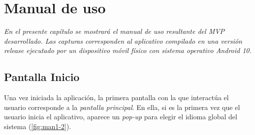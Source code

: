 \chapter{Manual de uso}
\textit{En el presente capítulo se mostrará el manual de uso resultante del MVP desarrollado.
Las capturas corresponden al aplicativo compilado en una versión release ejecutado por un dispositivo móvil físico con sistema operativo Android 10.}

\section{Pantalla Inicio}
Una vez iniciada la aplicación, la primera pantalla con la que interactúa el usuario corresponde a la \textit{pantalla principal}.
En ella, si es la primera vez que el usuario inicia el aplicativo, aparece un \textit{pop-up} para elegir
el idioma global del sistema (\autoref{fig:man1-2}).

